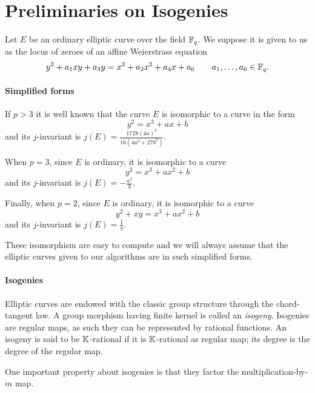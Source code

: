 \section{Preliminaries on Isogenies}

Let $E$ be an ordinary elliptic curve over the field $\mathbb{F}_q$. We
suppose it is given to us as the locus of zeroes of an affine
Weierstrass equation
\[y^2 + a_1xy + a_3y = x^3 + a_2x^2 + a_4x + a_6
\qquad a_1,\ldots,a_6\in\mathbb{F}_q\text{.}\]

\paragraph{Simplified forms} If $p>3$ it is well known that the curve
$E$ is isomorphic to a curve in the form
\begin{equation}
  \label{eq:weierstrass>3}
  y^2 = x^3 + ax + b
\end{equation}
and its $j$-invariant is $j(E) = \frac{1728(4a)^3}{16(4a^3 + 27b^2)}$.

When $p=3$, since $E$ is ordinary, it is isomorphic to a curve
\begin{equation}
  \label{eq:weierstrass=3}
  y^2 = x^3 + ax^2 + b
\end{equation}
and its $j$-invariant is $j(E) = -\frac{a^3}{b}$.

Finally, when $p=2$, since $E$ is ordinary, it is isomorphic to a curve
\begin{equation}
  \label{eq:weierstrass=2}
  y^2 + xy = x^3 + ax^2 + b
\end{equation}
and its $j$-invariant is $j(E) = \frac{1}{b}$.

These isomorphism are easy to compute and we will always assume that
the elliptic curves given to our algorithms are in such simplified
forms.

\paragraph{Isogenies}
Elliptic curves are endowed with the classic group structure through
the chord-tangent law. A group morphism having finite kernel is called
an \emph{isogeny}. Isogenies are regular maps, as such they can be
represented by rational functions. An isogeny is said to be
$\mathbb{K}$-rational if it is $\mathbb{K}$-rational as regular map; its degree is the
degree of the regular map.

One important property about isogenies is that they factor the
multiplication-by-$m$ map.

